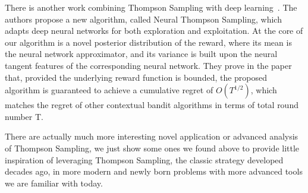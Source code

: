 \documentclass[11pt]{article}
\begin{document}
There is another work combining Thompson Sampling with deep learning~\cite{zhang2020neural}. The authors propose a new algorithm, called Neural Thompson Sampling, which adapts deep neural networks for both exploration and exploitation. At the core of our algorithm is a novel posterior distribution of the reward, where its mean is the
neural network approximator, and its variance is built upon the neural tangent features of the corresponding neural network. They prove in the paper that, provided the underlying reward function is bounded, the proposed algorithm is guaranteed to achieve a cumulative regret of $O(T^{1/2})$,
which matches the regret of other contextual bandit algorithms in terms of total round number T.


There are actually much more interesting novel application or advanced analysis of Thompson Sampling, we just show some ones we found above to provide little inspiration of leveraging Thompson Sampling, the classic strategy developed decades ago, in more modern and newly born problems with more advanced tools we are familiar with today.

\end{document}
